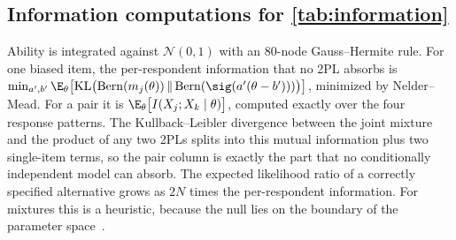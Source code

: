 \subsection{Information computations for \texorpdfstring{\cref{tab:information}}{the information table}}

Ability is integrated against $\mathcal N(0,1)$ with an 80-node Gauss--Hermite rule. For one biased
item, the per-respondent information that no 2PL absorbs is
$\min_{a',b'}\E_\theta\bigl[\mathrm{KL}\bigl(\mathrm{Bern}(m_j(\theta))\,\|\,\mathrm{Bern}(\sig(a'(\theta-b')))\bigr)\bigr]$,
minimized by Nelder--Mead. For a pair it is
$\E_\theta\bigl[I(X_j;X_k\mid\theta)\bigr]$, computed exactly over the four response patterns.
The Kullback--Leibler divergence between the joint mixture and the product of any two 2PLs splits
into this mutual information plus two single-item terms, so the pair column is exactly the part
that no conditionally independent model can absorb. The expected likelihood ratio of a correctly
specified alternative grows as $2N$ times the per-respondent information. For mixtures this is a
heuristic, because the null lies on the boundary of the parameter space~\cite{self1987}.
